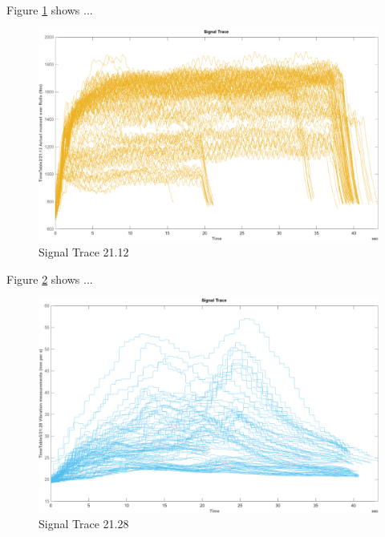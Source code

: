 \documentclass{article}
\begin{document}
Figure \ref{fig:SignalTrace21.12} shows ...
\begin{figure}[H]
    \centering
    \includegraphics[width=\textwidth, height=\textheight, keepaspectratio]{figures/SignalTrace21.12.png}
    \caption{Signal Trace 21.12}
    \label{fig:SignalTrace21.12}
\end{figure}

Figure \ref{fig:SignalTrace21.28} shows ...
\begin{figure}[H]
    \centering
    \includegraphics[width=\textwidth, height=\textheight, keepaspectratio]{figures/SignalTrace21.28.png}
    \caption{Signal Trace 21.28}
    \label{fig:SignalTrace21.28}
\end{figure}
\end{document}
